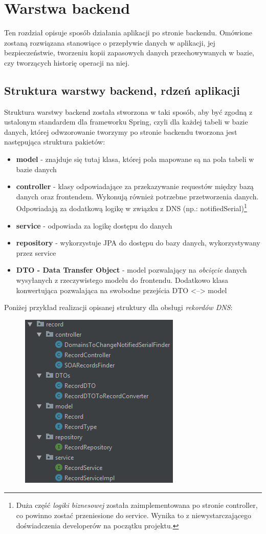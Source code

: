 \documentclass[11pt]{article}
\begin{document}
\section{Warstwa backend}
Ten rozdział opisuje sposób działania aplikacji po stronie backendu. Omówione zostaną rozwiązana stanowiące o przepływie danych w aplikacji, jej bezpieczeństwie, tworzeniu kopii zapasowych danych przechowywanych w bazie, czy tworzących historię operacji na niej.

\subsection{Struktura warstwy backend, rdzeń aplikacji}
Struktura warstwy backend została stworzona w taki sposób, aby być zgodną z ustalonym standardem dla frameworku Spring, czyli dla każdej tabeli w bazie danych, której odwzorowanie tworzymy po stronie backendu tworzona jest następująca struktura pakietów:
\begin{itemize}
\item \textbf{model} - znajduje się tutaj klasa, której pola mapowane są na pola tabeli w bazie danych
\item \textbf{controller} - klasy odpowiadające za przekazywanie requestów między bazą danych oraz frontendem. Wykonują również potrzebne przetworzenia danych. Odpowiadają za dodatkową logikę w związku z DNS (np.: notifiedSerial)\footnote{Duża część \emph{logiki biznesowej} została zaimplementowana po stronie controller, co powinno zostać przeniesione do service. Wynika to z niewystarczającego doświadczenia developerów na początku projektu.}
\item \textbf{service} - odpowiada za logikę dostępu do danych
\item \textbf{repository} - wykorzystuje JPA do dostępu do bazy danych, wykorzystywany przez service
\item \textbf{DTO - Data Transfer Object} - model pozwalający na \emph{obcięcie} danych wysyłanych z rzeczywistego modelu do frontendu. Dodatkowo klasa konwertująca pozwalająca na swobodne przejścia DTO <--> model
\end{itemize}
Poniżej przykład realizacji opisanej struktury dla obsługi \emph{rekordów DNS}:
\begin{figure}[H]
\centering
\includegraphics[scale=1]{res/back_struktura}
\end{figure}
\end{document}
